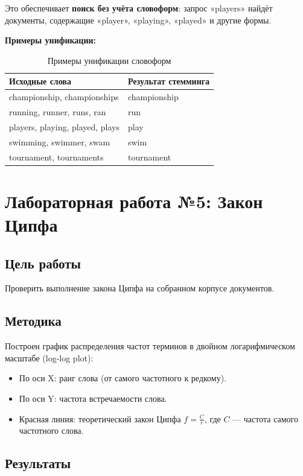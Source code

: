 \documentclass[a4paper,12pt]{article}
\begin{document}
Это обеспечивает \textbf{поиск без учёта словоформ}: запрос «players» найдёт документы, содержащие «player», «playing», «played» и другие формы.

\textbf{Примеры унификации:}
\begin{table}[H]
\centering
\begin{tabular}{|l|l|}
\hline
\textbf{Исходные слова} & \textbf{Результат стемминга} \\
\hline
championship, championships & championship \\
\hline
running, runner, runs, ran & run \\
\hline
players, playing, played, plays & play \\
\hline
swimming, swimmer, swam & swim \\
\hline
tournament, tournaments & tournament \\
\hline
\end{tabular}
\caption{Примеры унификации словоформ}
\end{table}

\section{Лабораторная работа №5: Закон Ципфа}

\subsection{Цель работы}
Проверить выполнение закона Ципфа на собранном корпусе документов.

\subsection{Методика}
Построен график распределения частот терминов в двойном логарифмическом масштабе (log-log plot):
\begin{itemize}
    \item По оси X: ранг слова (от самого частотного к редкому).
    \item По оси Y: частота встречаемости слова.
    \item Красная линия: теоретический закон Ципфа $f = \frac{C}{r}$, где $C$ --- частота самого частотного слова.
\end{itemize}

\subsection{Результаты}
\end{document}
